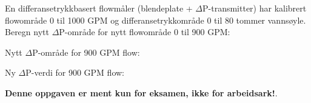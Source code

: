 

En differansetrykkbasert flowmåler (blendeplate + $\Delta$P-transmitter) har kalibrert flowområde 0 til 1000 GPM og differansetrykkområde 0 til 80 tommer vannsøyle. Beregn nytt $\Delta$P-område for nytt flowområde 0 til 900 GPM:

\vskip 10pt

Nytt $\Delta$P-område for 900 GPM flow: \underbar{\hskip 50pt}







Ny $\Delta$P-verdi for 900 GPM flow: 







{\bf Denne oppgaven er ment kun for eksamen, ikke for arbeidsark!}.


